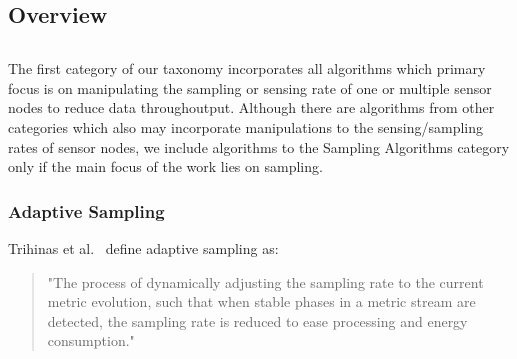 \subsection{Overview}
\label{sec:Overview}


\subsection{\catI} %
\label{sec:catI}

The first category of our taxonomy incorporates all algorithms which primary 
focus is on manipulating the sampling or sensing rate of one or multiple sensor
nodes to reduce data throughoutput. 
Although there are algorithms from other categories which also may incorporate
manipulations to the sensing/sampling rates of sensor nodes, we include
algorithms to the Sampling Algorithms category only if the main focus of the
work lies on sampling.


\subsubsection{Adaptive Sampling}
\label{sec:Adaptive Sampling}

Trihinas et al.~\cite{trihinas2015adam} define adaptive sampling as:

\begin{quote}
    "The process of dynamically adjusting the sampling rate to the current
    metric evolution, such that when stable phases in a metric stream are detected,
    the sampling rate is reduced to ease processing and energy consumption."
\end{quote}

